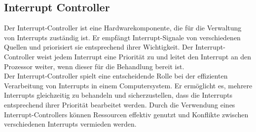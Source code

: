\documentclass[12pt,a4paper]{article}
\begin{document}
	\subsection{Interrupt Controller}
		Der Interrupt-Controller ist eine Hardwarekomponente, die für die Verwaltung von Interrupts zuständig ist. Er empfängt Interrupt-Signale von verschiedenen Quellen und priorisiert sie entsprechend ihrer Wichtigkeit. Der Interrupt-Controller weist jedem Interrupt eine Priorität zu und leitet den Interrupt an den Prozessor weiter, wenn dieser für die Behandlung bereit ist.\\
		Der Interrupt-Controller spielt eine entscheidende Rolle bei der effizienten Verarbeitung von Interrupts in einem Computersystem. Er ermöglicht es, mehrere Interrupts gleichzeitig zu behandeln und sicherzustellen, dass die Interrupts entsprechend ihrer Priorität bearbeitet werden. Durch die Verwendung eines Interrupt-Controllers können Ressourcen effektiv genutzt und Konflikte zwischen verschiedenen Interrupts vermieden werden.
\end{document}

